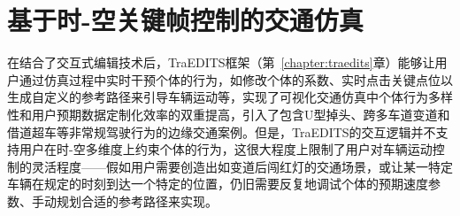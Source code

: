 
\chapter{基于时-空关键帧控制的交通仿真}
\label{chapter:keyframe}




在结合了交互式编辑技术后，TraEDITS框架（第~\ref{chapter:traedits}章）能够让用户通过仿真过程中实时干预个体的行为，如修改个体的系数、实时点击关键点位以生成自定义的参考路径来引导车辆运动等，实现了可视化交通仿真中个体行为多样性和用户预期数据定制化效率的双重提高，引入了包含U型掉头、跨多车道变道和借道超车等非常规驾驶行为的边缘交通案例。但是，TraEDITS的交互逻辑并不支持用户在时-空多维度上约束个体的行为，这很大程度上限制了用户对车辆运动控制的灵活程度——假如用户需要创造出如变道后闯红灯的交通场景，或让某一特定车辆在规定的时刻到达一个特定的位置，仍旧需要反复地调试个体的预期速度参数、手动规划合适的参考路径来实现。


